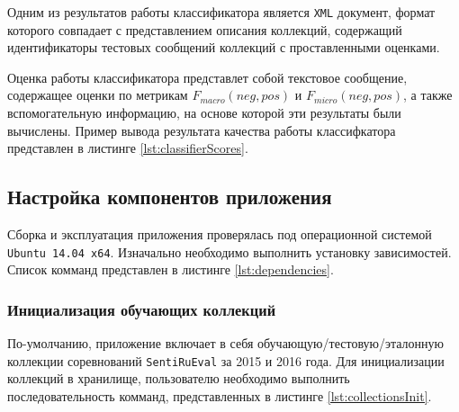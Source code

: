 
    Одним из результатов работы классификатора является {\tt XML}
    документ, формат которого совпадает с представлением описания коллекций,
    содержащий идентификаторы тестовых сообщений коллекций с проставленными оценками.


    Оценка работы классификатора представлет собой текстовое сообщение,
    содержащее оценки по метрикам  $F_{macro}(neg, pos)$ и $F_{micro}(neg, pos)$,
    а также вспомогательную информацию, на основе которой эти результаты были
    вычислены. Пример вывода результата качества работы классифкатора представлен
    в листинге \ref{lst:classifierScores}.
    \lstset{style=xml}
    

    \subsection{Настройка компонентов приложения}
    Сборка и эксплуатация приложения проверялась под операционной системой
    {\tt Ubuntu 14.04 x64}. Изначально необходимо выполнить установку зависимостей.
    Список комманд представлен в листинге \ref{lst:dependencies}.
    \lstset{style=bash}
    

    \subsubsection{Инициализация обучающих коллекций}
        По-умолчанию, приложение включает в себя обучающую/тестовую/эталонную
        коллекции соревнований {\tt SentiRuEval} за 2015 и 2016 года. Для
        инициализации коллекций в хранилище, пользователю необходимо выполнить
        последовательность комманд, представленных в листинге \ref{lst:collectionsInit}.
        \lstset{style=bash}
        

